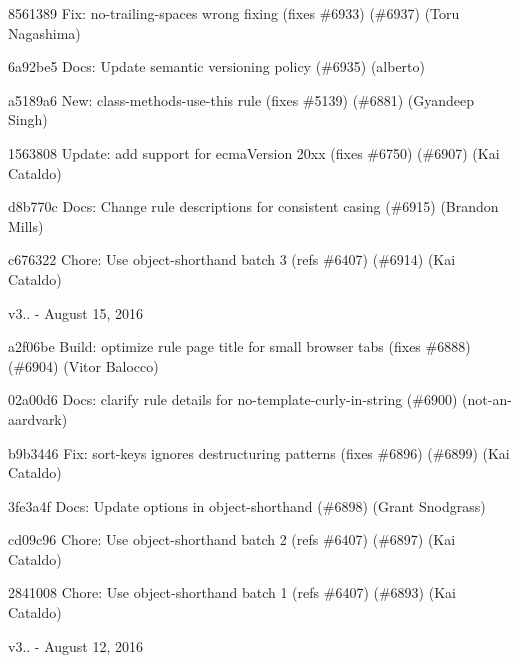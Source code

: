 \begin{DoxyItemize}
\item 8561389 Fix\+: {\ttfamily no-\/trailing-\/spaces} wrong fixing (fixes \#6933) (\#6937) (Toru Nagashima)
\item 6a92be5 Docs\+: Update semantic versioning policy (\#6935) (alberto)
\item a5189a6 New\+: {\ttfamily class-\/methods-\/use-\/this} rule (fixes \#5139) (\#6881) (Gyandeep Singh)
\item 1563808 Update\+: add support for ecma\+Version 20xx (fixes \#6750) (\#6907) (Kai Cataldo)
\item d8b770c Docs\+: Change rule descriptions for consistent casing (\#6915) (Brandon Mills)
\item c676322 Chore\+: Use object-\/shorthand batch 3 (refs \#6407) (\#6914) (Kai Cataldo)
\end{DoxyItemize}

v3.. -\/ August 15, 2016


\begin{DoxyItemize}
\item a2f06be Build\+: optimize rule page title for small browser tabs (fixes \#6888) (\#6904) (Vitor Balocco)
\item 02a00d6 Docs\+: clarify rule details for no-\/template-\/curly-\/in-\/string (\#6900) (not-\/an-\/aardvark)
\item b9b3446 Fix\+: sort-\/keys ignores destructuring patterns (fixes \#6896) (\#6899) (Kai Cataldo)
\item 3fe3a4f Docs\+: Update options in {\ttfamily object-\/shorthand} (\#6898) (Grant Snodgrass)
\item cd09c96 Chore\+: Use object-\/shorthand batch 2 (refs \#6407) (\#6897) (Kai Cataldo)
\item 2841008 Chore\+: Use object-\/shorthand batch 1 (refs \#6407) (\#6893) (Kai Cataldo)
\end{DoxyItemize}

v3.. -\/ August 12, 2016


